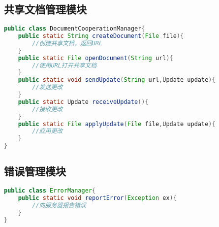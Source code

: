 \subsection{共享文档管理模块}
\begin{lstlisting}[language=Java, caption=共享文档管理模块接口]
public class DocumentCooperationManager{
    public static String createDocument(File file){
        //创建共享文档，返回URL
    }
    public static File openDocument(String url){
        //使用URL打开共享文档
    }
    public static void sendUpdate(String url,Update update){
        //发送更改
    }
    public static Update receiveUpdate(){
        //接收更改
    }
    public static File applyUpdate(File file,Update update){
        //应用更改
    }
}
\end{lstlisting}

\subsection{错误管理模块}
\begin{lstlisting}[language=Java, caption=错误管理模块接口]
public class ErrorManager{
    public static void reportError(Exception ex){
        //向服务器报告错误
    }
}
\end{lstlisting}


